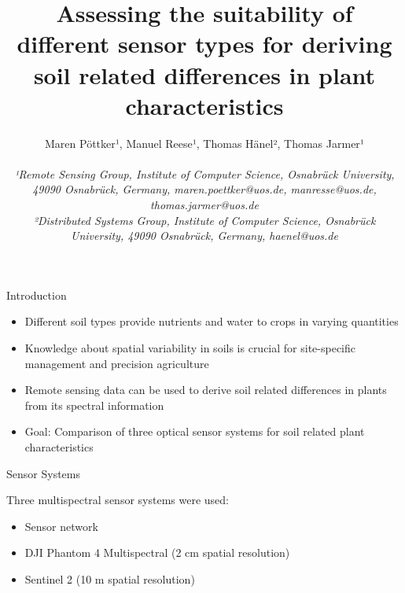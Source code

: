 \documentclass[final,hyperref={pdfpagelabels=false}]{beamer}
\title{Assessing the suitability of different sensor types for deriving soil related differences in plant characteristics}
\author{Maren Pöttker¹, Manuel Reese¹, Thomas Hänel², Thomas Jarmer¹ \\\,\\ \footnotesize{\textit{¹Remote Sensing Group,  Institute of Computer Science, Osnabrück University, 49090 Osnabrück, Germany, maren.poettker@uos.de, manresse@uos.de, thomas.jarmer@uos.de\\²Distributed Systems Group, Institute of Computer Science, Osnabrück University, 49090 Osnabrück, Germany, haenel@uos.de}}}
\begin{document}
\begin{frame}
\centering

\begin{minipage}[t][20cm][t]{0.315\paperwidth}


\begin{block}{Introduction}
\centering
\begin{minipage}{0.95\textwidth}
\small{\begin{itemize}
    \item Different soil types provide nutrients and water to crops in varying quantities \cite{saxton1986estimating}
    \item Knowledge about spatial variability in soils is crucial for site-specific management and precision agriculture \cite{khosla2002use}
    \item Remote sensing data can be used to derive soil related differences in plants from its spectral information \cite{weiss2020remote}
    \item Goal: Comparison of three optical sensor systems for soil related plant characteristics
\end{itemize}}
\vspace{0.65cm}
\end{minipage}
\end{block}
\end{minipage}
\hspace{4mm}
\begin{minipage}[t][20cm][t]{0.315\paperwidth}
\begin{block}{Sensor Systems }
\begin{minipage}{0.95\textwidth}
\centering
\end{minipage}
\vspace{0.3cm}
\begin{minipage}{0.95\textwidth}
\small{
Three multispectral sensor systems were used:
\begin{itemize}
    \item Sensor network \cite{hanel2019using, hanel2021learning}
    \item DJI Phantom 4 Multispectral (2 cm spatial resolution)
    \item Sentinel 2 (10 m spatial resolution)
\end{itemize}
}
\centering
\vspace{1cm}
\end{minipage}
\end{block}
\end{minipage}
\end{frame}
\end{document}
